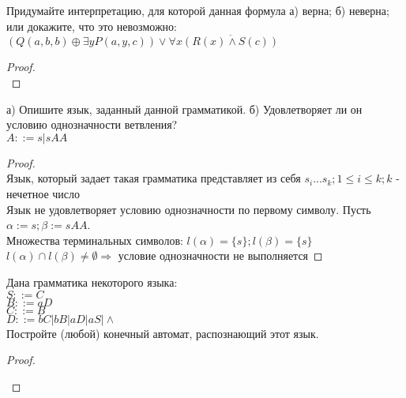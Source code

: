 \begin{problem}
Придумайте интерпретацию, для которой данная формула а) верна; б) неверна; или докажите, что это невозможно:\\
$(Q(a, b, b) \oplus \exists y P(a, y, c)) \vee \forall x \overline{(R(x) \wedge S(c))}$
\end{problem}
\begin{proof} $ $\\

\end{proof}


\begin{problem}
а) Опишите язык, заданный данной грамматикой. б) Удовлетворяет ли он условию однозначности ветвления?\\
$A ::= s|sAA$
\end{problem}
\begin{proof} $ $\\
Язык, который задает такая грамматика представляет из себя $s_i...s_k; 1 \leq i \leq k; k$ - нечетное число\\
Язык не удовлетворяет условию однозначности по первому символу. Пусть $\alpha := s; \beta := sAA$.\\
Множества терминальных символов: $l(\alpha) = \{s\}; l(\beta) = \{s\}$\\
$l(\alpha) \cap l(\beta) \neq \emptyset \Rightarrow $ условие однозначности не выполняется
\end{proof}


\begin{problem}
Дана грамматика некоторого языка:\\
$S ::= C$\\
$B ::= aD$\\
$C ::= B$\\
$D ::= bC|bB|aD|aS|\wedge$\\
Постройте (любой) конечный автомат, распознающий этот
язык.
\end{problem}
\begin{proof} $ $\\
\begin{center}
\end{center}
\end{proof}


